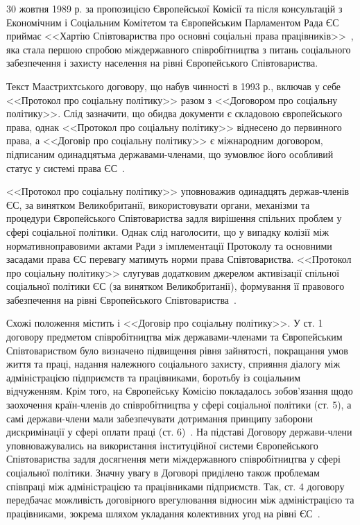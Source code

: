 30 жовтня 1989 р. за пропозицією Європейської Комісії та після консультацій з Економічним і Соціальним Комітетом та Європейським Парламентом Рада ЄС приймає <<Хартію Співтовариства про основні соціальні права працівників>>~\cite{Khartia96}, яка стала першою спробою міждержавного співробітництва з питань соціального забезпечення і захисту населення на рівні Європейського Співтовариства.

Текст Маастрихтського договору, що набув чинності в 1993 р., включав у себе <<Протокол про соціальну політику>> разом з <<Договором про соціальну політику>>. 
Слід зазначити, що обидва документи є складовою європейського права, однак <<Протокол про соціальну політику>> віднесено до первинного права, а <<Договір про соціальну політику>> є міжнародним договором, підписаним одинадцятьма державами-членами, що зумовлює його особливий статус у системі права ЄС~\cite{Shashula2015}. 

<<Протокол про соціальну політику>> уповноважив одинадцять держав-членів ЄС, за винятком Великобританії, використовувати органи, механізми та процедури Європейського Співтовариства задля вирішення спільних проблем у сфері соціальної політики. 
Однак слід наголосити, що у випадку колізії між нормативноправовими актами Ради з імплементації Протоколу та основними засадами права ЄС перевагу матимуть норми права Співтовариства. 
<<Протокол про соціальну політику>> слугував додатковим джерелом активізації спільної соціальної політики ЄС (за винятком Великобританії), формування її правового забезпечення на рівні Європейського Співтовариства~\cite{Shashula2015}.

Схожі положення містить і <<Договір про соціальну політику>>.
У ст. 1 договору предметом співробітництва між державами-членами та Європейським Співтовариством було визначено підвищення рівня зайнятості, покращання умов життя та праці, надання належного соціального захисту, сприяння діалогу між адміністрацією підприємств та працівниками, боротьбу із соціальним відчуженням. 
Крім того, на Європейську Комісію покладалось зобов’язання щодо заохочення країн-членів до співробітництва у сфері соціальної політики (ст. 5), а самі держави-члени мали забезпечувати дотримання принципу заборони дискримінації у сфері оплати праці (ст. 6)~\cite{Forster2002}. 
На підставі Договору держави-члени уповноважувались на використання інституційної системи Європейського Співтовариства задля досягнення мети міждержавного співробітництва у сфері соціальної політики. 
Значну увагу в Договорі приділено також проблемам співпраці між адміністрацією та працівниками підприємств. 
Так, ст. 4 договору передбачає можливість договірного врегулювання відносин між адміністрацією та працівниками, зокрема шляхом укладання колективних угод на рівні ЄС~\cite{Shashula2015}. 

